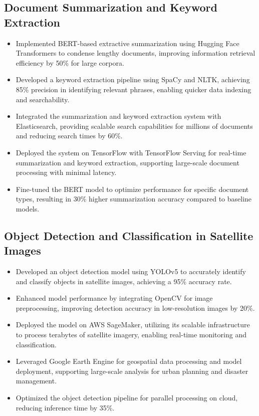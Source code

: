 \documentclass[12pt,a4paper]{article}
\begin{document}
\subsection*{Document Summarization and Keyword Extraction}
\begin{itemize}[leftmargin=*,noitemsep,topsep=0pt]
\item Implemented BERT-based extractive summarization using Hugging Face Transformers to condense lengthy documents, improving information retrieval efficiency by 50\% for large corpora.
\item Developed a keyword extraction pipeline using SpaCy and NLTK, achieving 85\% precision in identifying relevant phrases, enabling quicker data indexing and searchability.
\item Integrated the summarization and keyword extraction system with Elasticsearch, providing scalable search capabilities for millions of documents and reducing search times by 60\%.
\item Deployed the system on TensorFlow with TensorFlow Serving for real-time summarization and keyword extraction, supporting large-scale document processing with minimal latency.
\item Fine-tuned the BERT model to optimize performance for specific document types, resulting in 30\% higher summarization accuracy compared to baseline models.
\end{itemize}

\subsection*{Object Detection and Classification in Satellite Images}
\begin{itemize}[leftmargin=*,noitemsep,topsep=0pt]
\item Developed an object detection model using YOLOv5 to accurately identify and classify objects in satellite images, achieving a 95\% accuracy rate.
\item Enhanced model performance by integrating OpenCV for image preprocessing, improving detection accuracy in low-resolution images by 20\%.
\item Deployed the model on AWS SageMaker, utilizing its scalable infrastructure to process terabytes of satellite imagery, enabling real-time monitoring and classification.
\item Leveraged Google Earth Engine for geospatial data processing and model deployment, supporting large-scale analysis for urban planning and disaster management.
\item Optimized the object detection pipeline for parallel processing on cloud, reducing inference time by 35\%.
\end{itemize}
\end{document}
